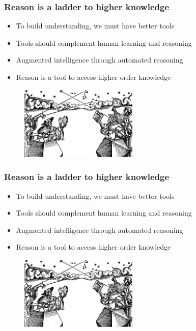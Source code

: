 \documentclass{beamer}
\begin{document}
  \begin{frame}
    \frametitle{Reason is a ladder to higher knowledge}
    \begin{itemize}
      \item To build understanding, we must have better tools
      \item Tools should complement human learning and reasoning
      \item Augmented intelligence through automated reasoning
      \item Reason is a tool to access higher order knowledge
    \end{itemize}
    \begin{figure}[H]
      \centering
      \includegraphics[width=0.5\textwidth]{../clipart/astronomers.png}
    \end{figure}
  \end{frame}

  \begin{frame}
    \frametitle{Reason is a ladder to higher knowledge}
    \begin{itemize}
      \item To build understanding, we must have better tools
      \item Tools should complement human learning and reasoning
      \item Augmented intelligence through automated reasoning
      \item Reason is a tool to access higher order knowledge
    \end{itemize}
    \begin{figure}[H]
      \centering
      \includegraphics[width=0.5\textwidth]{../clipart/astronomers.png}
    \end{figure}
  \end{frame}
\end{document}
